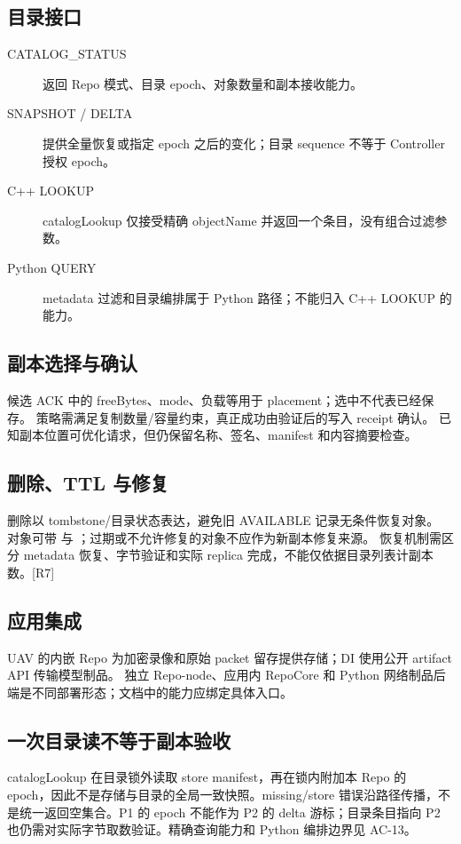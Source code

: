 \subsection{目录接口}
\begin{description}
\item[CATALOG\_STATUS] 返回 Repo 模式、目录 epoch、对象数量和副本接收能力。
\item[SNAPSHOT / DELTA] 提供全量恢复或指定 epoch 之后的变化；目录 sequence 不等于 Controller 授权 epoch。
\item[C++ LOOKUP] catalogLookup 仅接受精确 objectName 并返回一个条目，没有组合过滤参数。
\item[Python QUERY] metadata 过滤和目录编排属于 Python 路径；不能归入 C++ LOOKUP 的能力。
\end{description}

\subsection{副本选择与确认}
候选 ACK 中的 freeBytes、mode、负载等用于 placement；选中不代表已经保存。
策略需满足复制数量/容量约束，真正成功由验证后的写入 receipt 确认。
已知副本位置可优化请求，但仍保留名称、签名、manifest 和内容摘要检查。

\subsection{删除、TTL 与修复}
删除以 tombstone/目录状态表达，避免旧 AVAILABLE 记录无条件恢复对象。
对象可带  与 ；过期或不允许修复的对象不应作为新副本修复来源。
恢复机制需区分 metadata 恢复、字节验证和实际 replica 完成，不能仅依据目录列表计副本数。[R7]

\subsection{应用集成}
UAV 的内嵌 Repo 为加密录像和原始 packet 留存提供存储；DI 使用公开 artifact API 传输模型制品。
独立 Repo-node、应用内 RepoCore 和 Python 网络制品后端是不同部署形态；文档中的能力应绑定具体入口。


\subsection{一次目录读不等于副本验收}
catalogLookup 在目录锁外读取 store manifest，再在锁内附加本 Repo 的 epoch，因此不是存储与目录的全局一致快照。missing/store 错误沿路径传播，不是统一返回空集合。P1 的 epoch 不能作为 P2 的 delta 游标；目录条目指向 P2 也仍需对实际字节取数验证。精确查询能力和 Python 编排边界见 AC-13。

